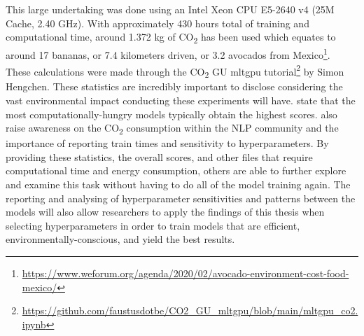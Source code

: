 This large undertaking was done using an Intel Xeon CPU E5-2640 v4 (25M Cache, 2.40 GHz). With approximately 430 hours total of training and computational time, around 1.372 kg of CO\textsubscript{2} has been used which equates to around 17 bananas, or 7.4 kilometers driven, or 3.2 avocados from Mexico\footnote{\url{https://www.weforum.org/agenda/2020/02/avocado-environment-cost-food-mexico/}}. These calculations were made through the CO\textsubscript{2} GU mltgpu tutorial\footnote{\url{https://github.com/faustusdotbe/CO2_GU_mltgpu/blob/main/mltgpu_co2.ipynb}} by Simon Hengchen. These statistics are incredibly important to disclose considering the vast environmental impact conducting these experiments will have. 
\citet{strubell-etal-2019-energy} state that the most computationally-hungry models typically obtain the highest scores. \citet{strubell-etal-2019-energy} also raise awareness on the CO\textsubscript{2} consumption within the NLP community and the importance of reporting train times and sensitivity to hyperparameters. By providing these statistics, the overall scores, and other files that require computational time and energy consumption, others are able to  further explore and examine this task without having to do all of the model training again. The reporting and analysing of hyperparameter sensitivities and patterns between the models will also allow researchers to apply the findings of this thesis when selecting hyperparameters in order to train models that are efficient, environmentally-conscious, and yield the best results.

